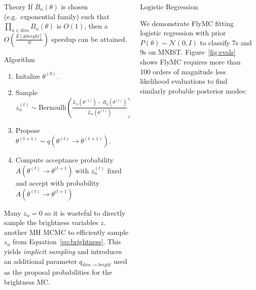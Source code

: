 \documentclass[final]{beamer}
\newlength{\onecolwid}
\newlength{\twocolwid}
\begin{document}
\begin{frame}[t]
\begin{columns}[t]
\begin{column}{\twocolwid}
\begin{columns}[t,totalwidth=\twocolwid]
\begin{column}{\onecolwid}
\begin{block}{Theory}
If $B_n(\theta)$ is chosen (e.g.\ exponential family) such that $\prod_{n \in
dim} B_n(\theta)$ is $O(1)$, then a $O(\frac{E[\# bright]}{N})$ speedup can
be attained.


\end{block}

\begin{block}{Algorithm}

\begin{enumerate}
  \item Initalize $\theta^{(0)}$.
  \item Sample $z^{(t)}_n \sim \text{Bernoulli}\left(
    \frac{L_n(\theta^{(t)}) - B_n(\theta^{(t)})}{L_n(\theta^{(t)})}
    \right)$
  \item Propose $\theta^{(t+1)} \sim q(\theta^{(t)} \to \theta^{(t+1)})$.
  \item Compute acceptance probability $A(\theta^{(t)} \to \theta^{(t+1})$
    with $z^{(t)}_n$ fixed and accept with probability $A(\theta^{(t)} \to \theta^{(t+1})$
\end{enumerate}

Many $z_n = 0$ so it is wasteful to directly sample the brightness variables
$z$. another MH MCMC to efficiently sample $z_n$ from
Equation~\ref{eq:brightness}. This yields \emph{implicit sampling} and
introduces an additional parameter $q_{dim \to bright}$ used as the proposal
probabilities for the brightness MC.

\end{block}

\end{column} %

\begin{column}{\onecolwid}\vspace{-.6in} %

\begin{block}{Logistic Regression}

We demonstrate FlyMC fitting logistic regression with prior
$P(\theta) \sim \mathcal{N}(0,I)$ to classify $7$s and $9$s on MNIST.
Figure~\ref{fig:evals} shows FlyMC requires more than 100 orders of magnitude
less likelihood evaluations to find similarly probable posterior modes:


\end{block}
\end{column}
\end{columns}
\end{column}
\end{columns}
\end{frame}
\end{document}
